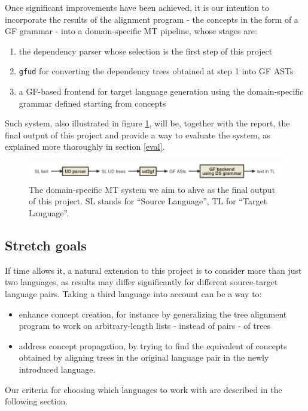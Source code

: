 \documentclass{article}
\begin{document}
Once significant improvements have been achieved, it is our intention to incorporate the results of the alignment program - the concepts in the form of a GF grammar - into a domain-specific MT pipeline, whose stages are:
\begin{enumerate}
    \item the dependency parser whose selection is the first step of this project
    \item \texttt{gfud} for converting the dependency trees obtained at step 1 into GF ASTs 
    \item a GF-based frontend for target language generation using the domain-specific grammar defined starting from concepts
\end{enumerate}

Such system, also illustrated in figure \ref{fig:mt}, will be, together with the report, the final output of this project and provide a way to evaluate the system, as explained more thoroughly in section \ref{eval}.

\begin{figure}[H]
    \centering
    \includegraphics[width=\textwidth]{MT.png}
    \caption{\small The domain-specific MT system we aim to ahve as the final output of this project. SL stands for ``Source Language'', TL for ``Target Language''.}
    \label{fig:mt}
\end{figure}

\subsection{Stretch goals} \label{stretch}
If time allows it, a natural extension to this project is to consider more than just two languages, as results may differ significantly for different source-target language pairs. 
Taking a third language into account can be a way to: 
\begin{itemize}
    \item enhance concept creation, for instance by generalizing the tree alignment program to work on arbitrary-length lists - instead of pairs - of trees 
    \item address concept propagation, by trying to find the equivalent of concepts obtained by aligning trees in the original language pair in the newly introduced language.
\end{itemize}
Our criteria for choosing which languages to work with are described in the following section.
\end{document}
